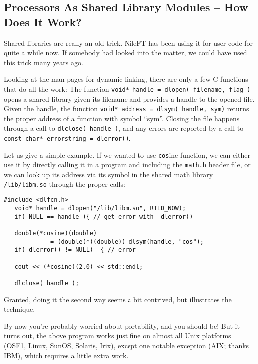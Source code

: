 \documentclass[12pt]{article}
\begin{document}
\begin{appendix}

\section{Processors As Shared Library Modules -- How Does It Work?
  }
\label{sec:SharedProcessors}

Shared libraries are really an old trick. NileFT has been using it for
user code for quite a while now. If somebody had looked into the matter,
we could have used this trick many years ago.

Looking at the man pages for dynamic linking, there are only a few C
functions that do all the work:
The function \texttt{void* handle = dlopen( filename, flag )} opens a
shared library given its filename and provides a handle to the opened file. 
Given the handle, the function \texttt{void* address = dlsym( handle,
sym)} returns the proper address of a function with symbol ``sym''.
Closing the file happens through a call to \texttt{dlclose( handle )},
and any errors are reported by a call to \texttt{const char* errorstring
= dlerror()}.

Let us give a simple example. If we wanted to use \texttt{cos}ine function,
we can either use it by directly calling it in a program and including the
\texttt{math.h} header file, or we can look up its address via its
symbol in the shared math library \texttt{/lib/libm.so} through the
proper calls:
%
\begin{verbatim}
#include <dlfcn.h>
   void* handle = dlopen("/lib/libm.so", RTLD_NOW);
   if( NULL == handle ){ // get error with  dlerror()

   double(*cosine)(double) 
             = (double(*)(double)) dlsym(handle, "cos");
   if( dlerror() != NULL)  { // error

   cout << (*cosine)(2.0) << std::endl;

   dlclose( handle );
\end{verbatim}
%
Granted, doing it the second way seems a bit contrived, but illustrates
the technique.

By now you're probably worried about portability, and you should be!
But it turns out, the above program works just fine on almost all Unix
platforms (OSF1, Linux, SunOS, Solaris, Irix), except one notable
exception (AIX; thanks IBM), which requires a little extra work.


\end{appendix}
\end{document}
